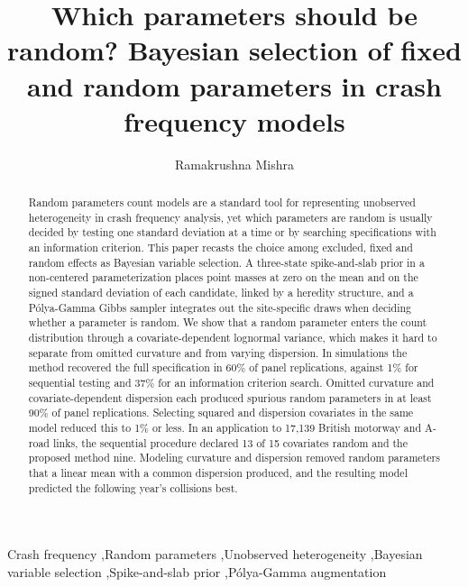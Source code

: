\documentclass[preprint,12pt,authoryear, a4paper]{elsarticle}
\theoremstyle{remark}
\begin{document}
\begin{frontmatter}

\title{Which parameters should be random? Bayesian selection of fixed and random parameters in crash frequency models}

\author[inst1]{Ramakrushna Mishra}

\begin{abstract}
Random parameters count models are a standard tool for representing unobserved heterogeneity in crash frequency analysis, yet which parameters are random is usually decided by testing one standard deviation at a time or by searching specifications with an information criterion. This paper recasts the choice among excluded, fixed and random effects as Bayesian variable selection. A three-state spike-and-slab prior in a non-centered parameterization places point masses at zero on the mean and on the signed standard deviation of each candidate, linked by a heredity structure, and a P\'olya-Gamma Gibbs sampler integrates out the site-specific draws when deciding whether a parameter is random. We show that a random parameter enters the count distribution through a covariate-dependent lognormal variance, which makes it hard to separate from omitted curvature and from varying dispersion. In simulations the method recovered the full specification in 60\% of panel replications, against 1\% for sequential testing and 37\% for an information criterion search. Omitted curvature and covariate-dependent dispersion each produced spurious random parameters in at least 90\% of panel replications. Selecting squared and dispersion covariates in the same model reduced this to 1\% or less. In an application to 17{,}139 British motorway and A-road links, the sequential procedure declared 13 of 15 covariates random and the proposed method nine. Modeling curvature and dispersion removed random parameters that a linear mean with a common dispersion produced, and the resulting model predicted the following year's collisions best.
\end{abstract}

\begin{keyword}
Crash frequency \sep Random parameters \sep Unobserved heterogeneity \sep Bayesian variable selection \sep Spike-and-slab prior \sep P\'olya-Gamma augmentation
\end{keyword}

\end{frontmatter}
\end{document}
